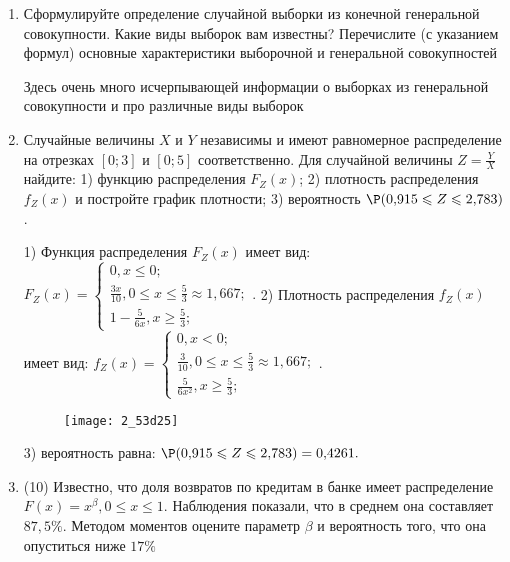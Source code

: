 \documentclass[a4paper,12pt]{article}
\begin{document}
\begin{enumerate}


\item


Сформулируйте определение случайной выборки из конечной генеральной совокупности. Какие
виды выборок вам известны? Перечислите (с указанием формул) основные характеристики выборочной и генеральной совокупностей




Здесь очень много исчерпывающей информации о выборках из генеральной совокупности и про различные виды выборок


\item



Случайные величины $X$ и $Y$ независимы и имеют равномерное
распределение на отрезках $[0;3]$ и $[0;5]$ соответственно. Для случайной величины $Z=\frac{Y}{X}$ найдите: 
1) функцию распределения $F_Z(x)$;
2) плотность распределения $f_Z(x)$ и постройте график плотности;
3) вероятность $\P(0,\!915\leqslant Z\leqslant 2,\!783)$.




1) Функция распределения $F_Z(x)$ имеет вид:
$
F_Z(x)=\left\{
\begin{array}{l}
0, x\leqslant 0;\\
\frac{3 x}{10}, 0\leqslant x\leqslant \frac{5}{3}\approx 1,\!667;\\
1 - \frac{5}{6 x}, x\geqslant\frac{5}{3};
\end{array}.
\right.
$
2) Плотность распределения $f_Z(x)$ имеет вид:
$
f_Z(x)=\left\{
\begin{array}{l}
0, x<0;\\
\frac{3}{10}, 0\leqslant x\leqslant \frac{5}{3}\approx 1,\!667;\\
\frac{5}{6 x^{2}}, x\geqslant\frac{5}{3};
\end{array}.
\right.
$


\begin{figure}[H]
    \texttt{[image: 2\_53d25]}
\end{figure}


3) вероятность равна:
$
\P(0,\!915\leqslant Z\leqslant 2,\!783)=
0,\!4261.
$


\item


(10) Известно, что доля возвратов по кредитам в банке имеет распределение $F(x) = x ^{\beta}, 0 \leqslant x \leqslant 1$.
Наблюдения показали, что в среднем она составляет $87,5\%$. Методом моментов оцените параметр $\beta$ и
вероятность того, что она опуститься ниже $17\%$





\end{enumerate}
\end{document}
